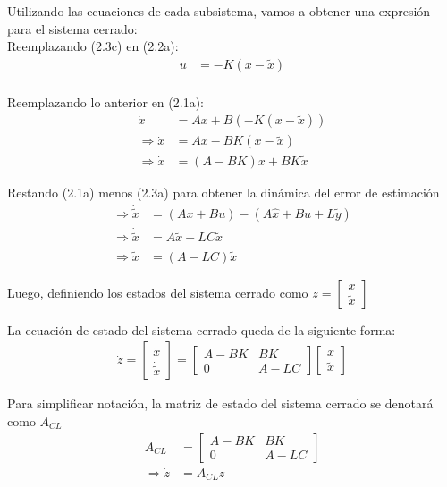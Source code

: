 Utilizando las ecuaciones de cada subsistema, vamos a obtener una expresión para el sistema cerrado: \\

Reemplazando (2.3c) en (2.2a):
\begin{align*}
    u&=-K(x-\tilde{x})\\
\end{align*}

Reemplazando lo anterior en (2.1a):
\begin{align*}
    \dot{x} &= Ax + B(-K(x - \tilde{x}))\\
    \Longrightarrow \dot{x} &= Ax - BK(x-\tilde{x}) \\
    \Longrightarrow \dot{x} &= (A-BK)x+BK\tilde{x}
\end{align*}

Restando (2.1a) menos (2.3a) para obtener la dinámica del error de estimación
\begin{align*}
    \Longrightarrow \dot{\tilde{x}} &= (Ax+Bu)-(A\hat{x}+Bu+L\tilde{y})\\
    \Longrightarrow \dot{\tilde{x}} &= A\tilde{x}-LC \tilde{x}\\
    \Longrightarrow \dot{\tilde{x}} &= (A-LC)\tilde{x}
\end{align*}

Luego, definiendo los estados del sistema cerrado como $z=\left[
    \begin{array}{c}
     x \\ \tilde{x} 
    \end{array}\right]$

La ecuación de estado del sistema cerrado queda de la siguiente forma:
\begin{align*}
    \dot{z}=\left[
    \begin{array}{c}
     \dot{x} \\ \dot{\tilde{x}} 
    \end{array}\right] = \left[
    \begin{array}{cc}
     A-BK & BK \\ 0 & A-LC 
    \end{array}\right]\left[
    \begin{array}{c}
     x \\ \tilde{x} 
    \end{array}\right]
\end{align*}

Para simplificar notación, la matriz de estado del sistema cerrado se denotará como $A_{CL}$
\begin{align*}
    A_{CL} &= \left[
    \begin{array}{cc}
     A-BK & BK \\ 0 & A-LC 
    \end{array}\right]\\
    \Longrightarrow \dot{z}&=A_{CL}z
\end{align*}

